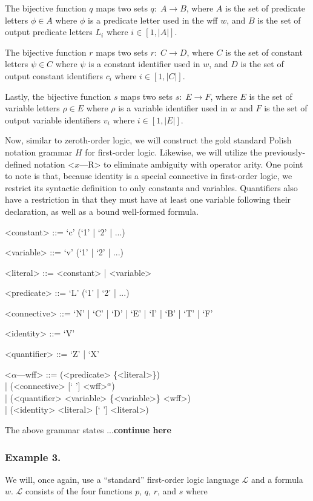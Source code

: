\documentclass[ms]{uncgdissertationexp2}
\theoremstyle{plain}
\theoremstyle{definition}
\theoremstyle{remark}
\begin{document}
The bijective function $q$ maps two sets $q:\;A \to B$, where $A$ is the set of predicate letters $\phi \in A$ where $\phi$ is a predicate letter used in the wff $w$, and $B$ is the set of output predicate letters $L_{i}$ where $i \in [1, |A|]$.

The bijective function $r$ maps two sets $r:\;C \to D$, where $C$ is the set of constant letters $\psi \in C$ where $\psi$ is a constant identifier used in $w$, and $D$ is the set of output constant identifiers $c_{i}$ where $i \in [1, |C|]$.

Lastly, the bijective function $s$ maps two sets $s:\;E \to F$, where $E$ is the set of variable letters $\rho \in E$ where $\rho$ is a variable identifier used in $w$ and $F$ is the set of output variable identifiers $v_{i}$ where $i \in [1, |E|]$.

Now, similar to zeroth-order logic, we will construct the gold standard Polish notation grammar $H$ for first-order logic. Likewise, we will utilize the previously-defined notation \textless{$x$---R\textgreater} to eliminate ambiguity with operator arity. One point to note is that, because identity is a special connective in first-order logic, we restrict its syntactic definition to only constants and variables. Quantifiers also have a restriction in that they must have at least one variable following their declaration, as well as a bound well-formed formula.
\begin{grammar}

    <constant> ::= `c' (`1' | `2' | ...)

    <variable> ::= `v' (`1' | `2' | ...)

    <literal> ::= <constant> | <variable>

    <predicate> ::= `L' (`1' | `2' | ...)

    <connective> ::= `N' | `C' | `D' | `E' | `I' | `B' | `T' | `F'

    <identity> ::= `V'

    <quantifier> ::= `Z' | `X'

    <$\alpha$---wff> ::= (<predicate> \{<literal>\}) \\| (<connective> [` '] <wff>$^{\alpha}$) \\| (<quantifier> <variable> \{<variable>\} <wff>)\\| (<identity> <literal> [` '] <literal>)
\end{grammar}

The above grammar states ...\textbf{continue here}
\subsubsection{Example 3.} We will, once again, use a ``standard'' first-order logic language $\mathcal{L}$ and a formula $w$. $\mathcal{L}$ consists of the four functions $p$, $q$, $r$, and $s$ where
\end{document}
